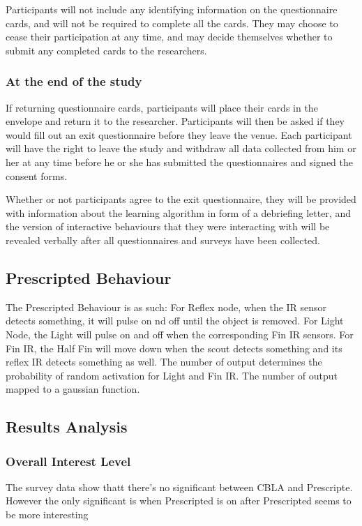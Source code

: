Participants will not include any identifying information on the questionnaire cards, and will not be required to complete all the cards. They may choose to cease their participation at any time, and may decide themselves whether to submit any completed cards to the researchers.

\subsubsection{At the end of the study}

If returning questionnaire cards, participants will place their cards in the envelope and return it to the researcher. Participants will then be asked if they would fill out an exit questionnaire before they leave the venue. Each participant will have the right to leave the study and withdraw all data collected from him or her at any time before he or she has submitted the questionnaires and signed the consent forms. 

Whether or not participants agree to the exit questionnaire, they will be provided with
information about the learning algorithm in form of a debriefing letter, and the version of
interactive behaviours that they were interacting with will be revealed verbally after all
questionnaires and surveys have been collected.

\subsection{Prescripted Behaviour}

The Prescripted Behaviour is as such:
For Reflex node, when the IR sensor detects something, it will pulse on nd off until the object is removed.
For Light Node, the Light will pulse on and off when the corresponding Fin IR sensors.
For Fin IR, the Half Fin will move down when the scout detects something and its reflex IR detects something as well.  
The number of output determines the probability of random activation for Light and Fin IR. The number of output mapped to a gaussian function. 


\subsection{Results Analysis}

\subsubsection{Overall Interest Level}
The survey data show thatt there's no significant between CBLA and Prescripte.
However the only significant is when Prescripted is on after Prescripted seems to be more interesting
 

